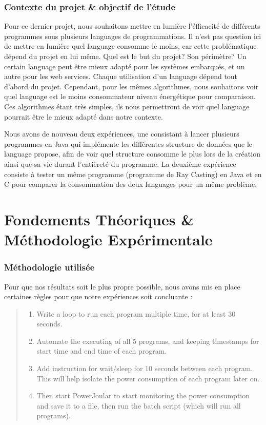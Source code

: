 \documentclass[12pt, a4paper]{report}
\begin{document}
\subsection{Contexte du projet & objectif de l'étude}
Pour ce dernier projet, nous souhaitons mettre en lumière l'éfficacité de différents programmes sous plusieurs languages de programmations. 
Il n'est pas question ici de mettre en lumière quel language consomme le moins, car cette problématique dépend du projet en lui même. Quel est le but du projet? Son périmètre? 
Un certain language peut être mieux adapté pour les systèmes embarqués, et un autre pour les web services. Chaque utilisation d'un language dépend tout d'abord du projet.
Cependant, pour les mêmes algorithmes, nous souhaitons voir quel language est le moins consommateur niveau énergétique pour comparaison. Ces algorithmes étant très simples, ils nous permettront de voir quel language pourrait être le mieux adapté dans notre contexte.

Nous avons de nouveau deux expériences, une consistant à lancer plusieurs programmes en Java qui implémente les différentes structure de données que le language propose, afin de voir quel structure consomme le plus lors de la création ainsi que sa vie durant l'entièreté du programme.
La deuxième expérience consiste à tester un même programme (programme de Ray Casting) en Java et en C pour comparer la consommation des deux languages pour un même problème.


\chapter{\centering Fondements Théoriques \& Méthodologie Expérimentale}

\subsection{Méthodologie utilisée}
Pour que nos résultats soit le plus propre possible, nous avons mis en place certaines règles pour que notre expériences soit concluante : 
\begin{quote}
    \begin{enumerate}
        \item Write a loop to run each program multiple time, for at least 30 seconds.
        \item Automate the executing of all 5 programs, and keeping timestamps for start time and end time of each program.
        \item Add instruction for wait/sleep for 10 seconds between each program. This will help isolate the power consumption of each program later on.
        \item Then start PowerJoular to start monitoring the power consumption and save it to a file, then run the batch script (which will run all programs).
    \end{enumerate}
\end{quote}
\end{document}
